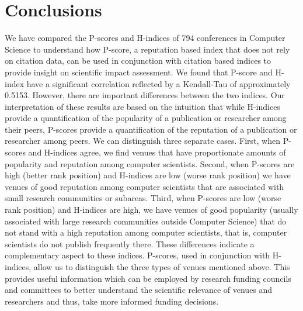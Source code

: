 \documentclass[notitlepage]{svjour3}
\begin{document}

\section{Conclusions}
\label{sec:conclusions}

We have compared the P-scores and H-indices of 794 conferences in Computer Science to
understand how P-score, a reputation based index that does not rely on citation data, can be 
used in conjunction with citation based indices to provide insight on scientific impact
assessment.
We found that P-score and H-index have a significant correlation reflected 
by a Kendall-Tau of approximately 0.5153. However,
there are important differences between the two indices.
Our interpretation of these results are based on the intuition that while H-indices 
provide a quantification of the popularity of a publication or researcher among their 
peers, P-scores provide a quantification of the reputation of a publication or 
researcher among peers.
We can distinguish three separate cases. First, when P-scores and 
H-indices agree, we find venues that have proportionate amounts of popularity and 
reputation among computer scientists. Second, when P-scores 
are high (better rank position) and H-indices are low (worse rank position) we have 
venues of good reputation among computer scientists that are associated with small 
research communities or subareas. Third, when P-scores are low (worse rank position) 
and H-indices are high, we have venues of good popularity (usually associated with 
large research communities outside Computer Science) that do not stand with a high
reputation among computer scientists, that is, computer scientists do not publish 
frequently there. These differences indicate a complementary aspect to these indices. P-scores, 
used in conjunction with H-indices, allow us to distinguish the three types of 
venues mentioned above. This provides useful information which can be employed
by research funding councils and committees to better understand the scientific relevance 
of venues and researchers and thus, take more informed funding decisions. 
\end{document}
